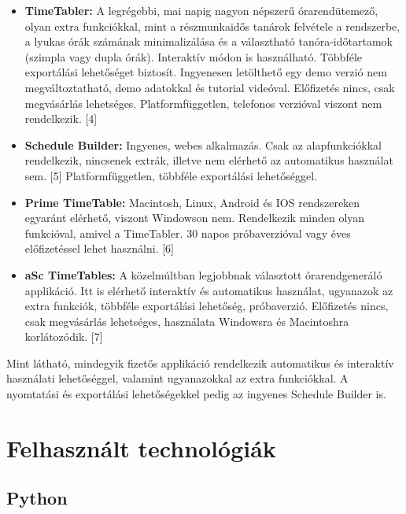 \documentclass[12pt,a4paper]{report}
\begin{document}
\begin{itemize}
    \item \textbf{TimeTabler:} A legrégebbi, mai napig nagyon népszerű órarendütemező, olyan extra funkciókkal,
             mint a részmunkaidős tanárok felvétele a rendszerbe, a lyukas órák számának minimalizálása és a választható
             tanóra-időtartamok (szimpla vagy dupla órák). Interaktív módon is használható. Többféle exportálási lehetőséget biztosít.
             Ingyenesen letölthető egy demo verzió nem megváltoztatható, demo adatokkal és 
             tutorial videóval. Előfizetés nincs, csak megvásárlás lehetséges. 
             Platformfüggetlen, telefonos verzióval viszont nem rendelkezik. [4]
    \item \textbf{Schedule Builder:} Ingyenes, webes alkalmazás. Csak az alapfunkciókkal rendelkezik,
                   nincsenek extrák, illetve nem elérhető az automatikus használat sem. [5]
                   Platformfüggetlen, többféle exportálási lehetőséggel.
    \item \textbf{Prime TimeTable:} Macintosh, Linux, Android és IOS rendszereken egyaránt elérhető, viszont
                  Windowson nem. Rendelkezik minden olyan funkcióval, amivel a TimeTabler. 30 napos próbaverzióval vagy éves
                  előfizetéssel lehet használni. [6]
    \item \textbf{aSc TimeTables:} A közelmúltban legjobbnak választott órarendgeneráló applikáció. Itt is elérhető interaktív és
                 automatikus használat, ugyanazok az extra funkciók, többféle exportálási lehetőség, próbaverzió. Előfizetés nincs, csak
                 megvásárlás lehetséges, használata Windowsra és Macintoshra korlátozódik. [7]
\end{itemize}

Mint látható, mindegyik fizetős applikáció rendelkezik automatikus és interaktív használati
lehetőséggel, valamint ugyanazokkal az extra funkciókkal. A nyomtatási és exportálási lehetőségekkel
pedig az ingyenes Schedule Builder is. 

\section{Felhasznált technológiák}

\subsection{Python}
\end{document}
